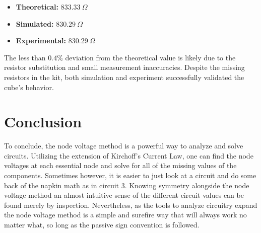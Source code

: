 \documentclass[12pt]{article}
\begin{document}
\begin{itemize}
	\item \textbf{Theoretical:} $833.33\ \Omega$
	\item \textbf{Simulated:} $830.29\ \Omega$
	\item \textbf{Experimental:} $830.29\ \Omega$
\end{itemize}

The less than $0.4\%$ deviation from the theoretical value is likely due to the resistor substitution and small measurement inaccuracies. Despite the missing resistors in the kit, both simulation and experiment successfully validated the cube’s behavior.

\section{Conclusion}
To conclude, the node voltage method is a powerful way to analyze and solve
circuits. Utilizing the extension of Kirchoff's Current Law, one can find the
node voltages at each essential node and solve for all of the missing values of
the components. Sometimes however, it is easier to just look at a circuit and do
some back of the napkin math as in circuit 3. Knowing symmetry alongside the
node voltage method an almost intuitive sense of the different circuit values
can be found merely by inspection. Nevertheless, as the tools to analyze
circuitry expand the node voltage method is a simple and surefire way that will
always work no matter what, so long as the passive sign convention is followed.
\end{document}
